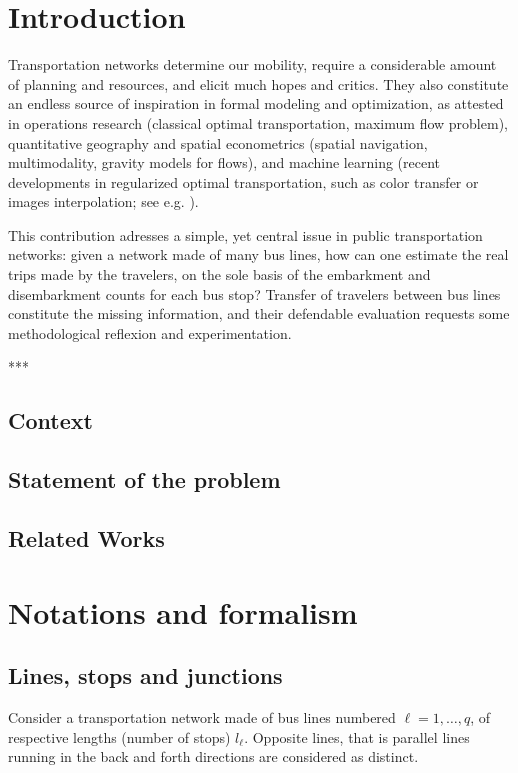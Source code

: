\documentclass{bmcart}
\begin{document}
 

\section{Introduction}
Transportation networks determine our mobility, require a considerable amount of planning and resources, and elicit much hopes and critics. 
They also constitute an endless source of inspiration in formal modeling and optimization, as attested in operations research (classical optimal transportation, maximum flow problem), quantitative geography and spatial econometrics (spatial navigation, multimodality, gravity models for flows), and machine learning (recent developments in regularized optimal transportation, such as color transfer or images interpolation; see e.g. \cite{peyre2019computational}). 

This contribution adresses a simple, yet central issue in public transportation networks: given a network made of many bus lines, how can one estimate the real trips made by the travelers, on the sole basis of  the embarkment and disembarkment counts for each bus stop? Transfer of travelers between bus lines constitute the missing information, and their defendable evaluation requests some methodological reflexion and experimentation. 

***

\subsection{Context}

\subsection{Statement of the problem}

\subsection{Related Works}





\section{Notations and formalism}
\subsection{Lines, stops  and junctions}
\label{Lines and junctions}
Consider a transportation network made of bus lines numbered $\ell=1,\ldots, q$, of respective lengths (number of stops) $l_\ell$.  Opposite lines, that is parallel lines running in the back and forth directions are considered as distinct. 
\end{document}
